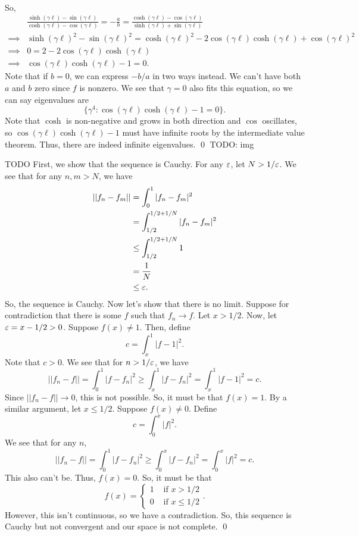 \documentclass{article}
\begin{document}
\begin{enumerate}[(a)]
\begin{align*}
    \end{align*}
    So, 
    \begin{align*}
        &\frac{\sinh(\gamma\ell)-\sin(\gamma\ell)}{\cosh(\gamma\ell)-\cos(\gamma\ell)} = -\frac{a}{b} = \frac{\cosh(\gamma\ell)-\cos(\gamma\ell)}{\sinh(\gamma\ell)+\sin(\gamma\ell)} \\
        \implies& \sinh(\gamma\ell)^2 -\sin(\gamma\ell)^2 = \cosh(\gamma\ell)^2 - 2 \cos(\gamma\ell)\cosh(\gamma\ell) + \cos(\gamma\ell)^2 \\
        \implies& 0 = 2 - 2\cos(\gamma\ell)\cosh(\gamma\ell) \\
        \implies& \cos(\gamma\ell) \cosh(\gamma\ell) - 1 = 0.
    \end{align*}
    Note that if $b=0$, we can express $-b/a$ in two ways instead. We can't have both $a$ and $b$ zero since $f$ is nonzero. 
    \hop
    We see that $\gamma = 0$ also fits this equation, so we can say eigenvalues are \[\{\gamma^4:  \cos(\gamma\ell) \cosh(\gamma\ell) - 1 = 0\}.\]
    Note that $\cosh$ is non-negative and grows in both direction and $\cos$ oscillates, so $\cos(\gamma\ell) \cosh(\gamma\ell) - 1$ must have infinite roots by the intermediate value theorem. Thus, there are indeed infinite eigenvalues. \qed
    TODO: img
\end{enumerate}


\newpage
{} TODO
 \tri
\hop 
\solution
First, we show that the sequence is Cauchy. For any $\varepsilon$, let $N >1/\varepsilon$. We see that for any $n, m > N$, we have
\begin{align*}
    ||f_n - f_m|| &= \int_0^1|f_n-f_m|^2 \\
    &= \int_{1/2}^{1/2+1/N}|f_n-f_m|^2 \\
    &\le \int_{1/2}^{1/2+1/N}1 \\
    &= \frac{1}{N} \\
    &\le \varepsilon.
\end{align*}
So, the sequence is Cauchy.
\hop 
Now let's show that there is no limit. Suppose for contradiction that there is some $f$ such that $f_n \to f$. Let $x > 1/2$. Now, let $\varepsilon = x - 1/2 > 0$. Suppose $f(x) \ne 1$. Then, define 
\[c = \int_x^1 |f-1|^2.\]
Note that $c >0$. We see that for $n>1/\varepsilon$, we have 
\[||f_n - f|| = \int_0^1|f-f_n|^2 \ge \int_x^1|f-f_n|^2 =\int_x^1|f-1|^2 = c.\]
Since $||f_n -f|| \to 0$, this is not possible. So, it must be that $f(x) = 1$. 
\hop 
By a similar argument, let $x \le 1/2$. Suppose $f(x) \ne 0$. Define 
\[c = \int_0^x |f|^2.\]
We see that for any $n$,
\[||f_n - f|| = \int_0^1|f-f_n|^2 \ge \int_0^x|f-f_n|^2  = \int_0^x|f|^2 = c. \]
This also can't be. Thus, $f(x) = 0$. So, it must be that 
\[f(x) = \begin{cases}
    1 &\text{ if } x > 1/2\\
    0 &\text{ if } x \le 1/2
\end{cases}.\]
However, this isn't continuous, so we have a contradiction. So, this sequence is Cauchy but not convergent and our space is not complete. \qed
\end{document}
